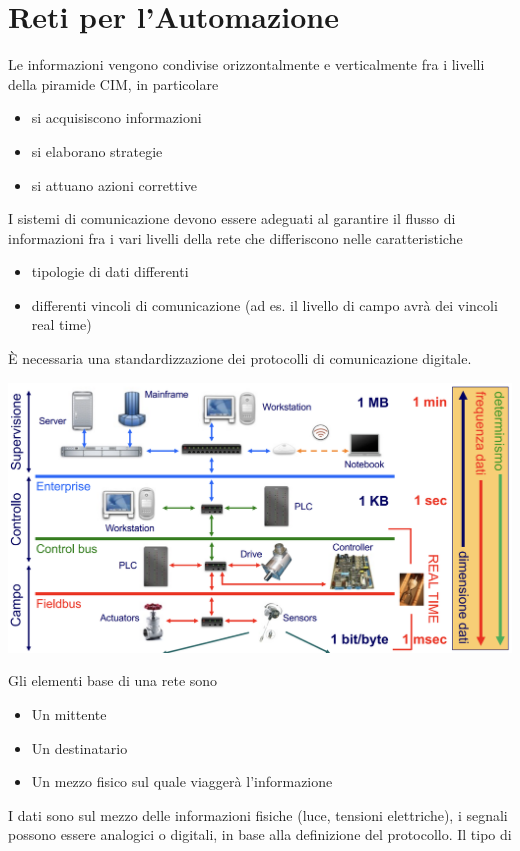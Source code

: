 \documentclass[10pt, letterpaper]{report}
\begin{document}
\chapter{Reti per l'Automazione}
Le informazioni vengono condivise orizzontalmente e verticalmente 
fra i livelli della piramide CIM, in particolare\begin{itemize}
    \item si acquisiscono informazioni 
    \item si elaborano strategie 
    \item si attuano azioni correttive
\end{itemize}
I sistemi di comunicazione devono essere adeguati 
al garantire il flusso di informazioni fra i vari livelli della 
rete che differiscono nelle caratteristiche\begin{itemize}
    \item tipologie di dati differenti 
    \item differenti vincoli di comunicazione (ad es. il livello di campo 
    avrà dei vincoli real time)
\end{itemize}
È necessaria una standardizzazione dei protocolli di comunicazione digitale.
\begin{center}
    \includegraphics[width=1\textwidth ]{images/reti.png}
\end{center}
Gli elementi base di una rete sono \begin{itemize}
    \item Un mittente 
    \item Un destinatario 
    \item Un mezzo fisico sul quale viaggerà l'informazione 
\end{itemize}
I dati sono sul mezzo delle informazioni fisiche (luce, tensioni 
elettriche), i segnali possono essere analogici o digitali, 
in base alla definizione del protocollo. Il tipo di 
\end{document}

